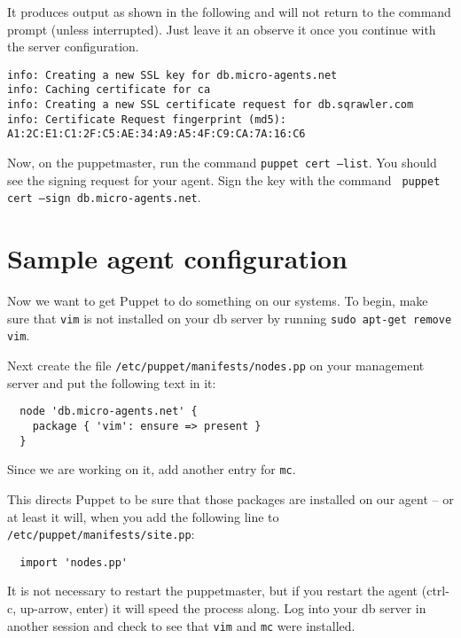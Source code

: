 \documentclass{article}
\newcommand{\domain}{micro-agents.net}
\begin{document}
It produces output as shown in the following and will not return to the command prompt (unless interrupted). Just leave it an observe it once you continue with the server configuration.

\begin{verbatim}
info: Creating a new SSL key for db.micro-agents.net
info: Caching certificate for ca
info: Creating a new SSL certificate request for db.sqrawler.com
info: Certificate Request fingerprint (md5): A1:2C:E1:C1:2F:C5:AE:34:A9:A5:4F:C9:CA:7A:16:C6

\end{verbatim}

Now, on the puppetmaster, run the command \texttt{puppet cert --list}.  You should see the signing request for your agent.  Sign the key with the command \texttt{ puppet cert --sign db.\domain}.

\section{Sample agent configuration}
Now we want to get Puppet to do something on our systems.  To begin, make sure that \texttt{vim} is not installed on your db server by running \texttt{sudo apt-get remove vim}. 

Next create the file \texttt{/etc/puppet/manifests/nodes.pp} on your management server and put the following text in it:
\begin{verbatim}
  node 'db.micro-agents.net' {
    package { 'vim': ensure => present }
  }
\end{verbatim}

Since we are working on it, add another entry for \texttt{mc}.

This directs Puppet to be sure that those packages are installed on our agent -- or at least it will, when you add the following line to \texttt{/etc/puppet/manifests/site.pp}:

\begin{verbatim}
  import 'nodes.pp'
\end{verbatim}

It is not necessary to restart the puppetmaster, but if you restart the agent (ctrl-c, up-arrow, enter) it will speed the process along.  Log into your db server in another session and check to see that \texttt{vim} and \texttt{mc} were installed. 
\end{document}
